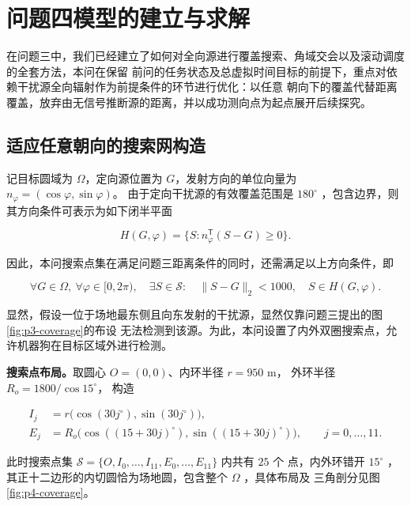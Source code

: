 \documentclass[withoutpreface,bwprint]{cumcmthesis} %
\begin{document}
\section{问题四模型的建立与求解}

在问题三中，我们已经建立了如何对全向源进行覆盖搜索、角域交会以及滚动调度的全套方法，本问在保留
前问的任务状态及总虚拟时间目标的前提下，重点对依赖干扰源全向辐射作为前提条件的环节进行优化：以任意
朝向下的覆盖代替距离覆盖，放弃由无信号推断源的距离，并以成功测向点为起点展开后续探究。

\subsection{适应任意朝向的搜索网构造}

记目标圆域为 $\Omega$，定向源位置为 $G$，发射方向的单位向量为 $n_\varphi=(\cos\varphi,\sin\varphi)$。
由于定向干扰源的有效覆盖范围是 $180^\circ$ ，包含边界，则其方向条件可表示为如下闭半平面

\begin{equation}\label{eq:p4-halfplane}
H(G,\varphi)=\{S:n_\varphi^{\mathsf T}(S-G)\ge0\}.
\end{equation}

因此，本问搜索点集在满足问题三距离条件的同时，还需满足以上方向条件，即

\begin{equation}\label{eq:p4-cover}
\forall G\in\Omega,\ \forall\varphi\in[0,2\pi),\quad
\exists S\in\mathcal S:\quad \|S-G\|_2<1000,\quad S\in H(G,\varphi).
\end{equation}

显然，假设一位于场地最东侧且向东发射的干扰源，显然仅靠问题三提出的图\ref{fig:p3-coverage}的布设
无法检测到该源。为此，本问设置了内外双圈搜索点，允许机器狗在目标区域外进行检测。

\textbf{搜索点布局。}取圆心 $O=(0,0)$、内环半径 $r=950$ m， 外环半径 $R_o=1800/\cos15^\circ$，
构造

\begin{equation}\label{eq:p4-points}
\begin{aligned}
I_j&=r\bigl(\cos(30j^\circ),\sin(30j^\circ)\bigr),\\
E_j&=R_o\bigl(\cos((15+30j)^\circ),\sin((15+30j)^\circ)\bigr),
\qquad j=0,\ldots,11.
\end{aligned}
\end{equation}

此时搜索点集 $\mathcal S=\{O,I_0,\ldots,I_{11},E_0,\ldots,E_{11}\}$ 内共有 $25$ 个
点，内外环错开 $15^\circ$ ，其正十二边形的内切圆恰为场地圆，包含整个 $\Omega$ ，具体布局及
三角剖分见图\ref{fig:p4-coverage}。
\end{document}
